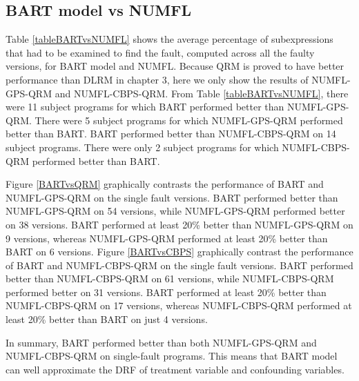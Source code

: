 \subsection{BART model vs NUMFL}
Table \ref{tableBARTvsNUMFL} shows the average percentage of subexpressions that had to be examined to find the fault, computed across all the faulty versions, for BART model and NUMFL.  Because QRM is proved to have better performance than DLRM in chapter 3, here we only show the results of NUMFL-GPS-QRM and NUMFL-CBPS-QRM.  From Table \ref{tableBARTvsNUMFL}, there were 11 subject programs for which BART performed better than NUMFL-GPS-QRM. There were 5 subject programs for which NUMFL-GPS-QRM performed better than BART. BART performed better than NUMFL-CBPS-QRM on 14 subject programs. There were only 2 subject programs for which NUMFL-CBPS-QRM performed better than BART.

Figure \ref{BARTvsQRM} graphically contrasts the performance of BART and NUMFL-GPS-QRM on the single fault versions.  BART performed better than NUMFL-GPS-QRM on 54 versions, while NUMFL-GPS-QRM performed better on 38 versions.  BART performed at least 20\% better than NUMFL-GPS-QRM on 9 versions, whereas NUMFL-GPS-QRM performed at least 20\% better than BART on 6 versions. Figure \ref{BARTvsCBPS} graphically contrast the performance of BART and NUMFL-CBPS-QRM on the single fault versions.  BART performed better than NUMFL-CBPS-QRM on 61 versions, while NUMFL-CBPS-QRM performed better on 31 versions.  BART performed at least 20\% better than NUMFL-CBPS-QRM on 17 versions, whereas NUMFL-CBPS-QRM performed at least 20\% better than BART on just 4 versions.

In summary, BART  performed better than both NUMFL-GPS-QRM and NUMFL-CBPS-QRM on single-fault programs. This means that BART model can well approximate the DRF of treatment variable and confounding variables.

